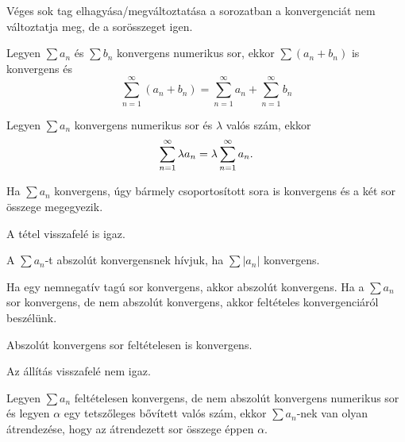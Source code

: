 \begin{note}
  Véges sok tag elhagyása/megváltoztatása a sorozatban a konvergenciát nem
  változtatja meg, de a sorösszeget igen.
\end{note}

\begin{note}
  Legyen $\sum a_n$ és $\sum b_n$ konvergens numerikus sor, ekkor $\sum (a_n +
    b_n)$ is konvergens és
  \vspace{-.75em}
  \[
    \sum_{n=1}^\infty (a_n + b_n)
    = \sum_{n=1}^\infty a_n + \sum_{n=1}^\infty b_n
  \]
\end{note}

\begin{note}
  Legyen $\sum a_n$ konvergens numerikus sor és $\lambda$ valós szám, ekkor
  \vspace{-.75em}
  \[
    \sum_{n=1}^\infty \lambda a_n
    = \lambda \sum_{n=1}^\infty a_n
    \text.
  \]
\end{note}

\begin{theorem}
  Ha $\sum a_n$ konvergens, úgy bármely csoportosított sora is konvergens és a
  két sor összege megegyezik.
\end{theorem}

\begin{note}
  A tétel visszafelé is igaz.
\end{note}

\begin{definition}
  A $\sum a_n$-t abszolút konvergensnek hívjuk, ha $\sum |a_n|$ konvergens.
\end{definition}

\begin{note}
  Ha egy nemnegatív tagú sor konvergens, akkor abszolút konvergens. Ha a
  $\sum a_n$  sor konvergens, de nem abszolút konvergens, akkor feltételes
  konvergenciáról beszélünk.
\end{note}

\begin{theorem}
  Abszolút konvergens sor feltételesen is konvergens.
\end{theorem}

\begin{note}
  Az állítás visszafelé nem igaz.
\end{note}

\begin{theorem}
  Legyen $\sum a_n$ feltételesen konvergens, de nem abszolút konvergens
  numerikus sor és legyen $\alpha$ egy tetszőleges bővített valós szám, ekkor
  $\sum a_n$-nek van olyan átrendezése, hogy az átrendezett sor összege éppen
  $\alpha$.
\end{theorem}

